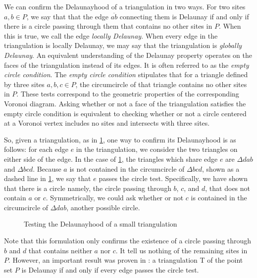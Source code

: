 \documentclass[12pt,twoside]{reedthesis}
\begin{document}
    We can confirm the Delaunayhood of a triangulation in two ways. For two sites $a, b \in P$, we say that that the edge $\overline{ab}$ connecting them is Delaunay if and only if there is a circle passing through them that contains no other sites in $P$. When this is true, we call the edge \emph{locally Delaunay}. When every edge in the triangulation is locally Delaunay, we may say that the triangulation is \emph{globally Delaunay}. An equivalent understanding of the Delaunay property operates on the faces of the triangulation instead of its edges. It is often referred to as the \emph{empty circle condition}. The \emph{empty circle condition} stipulates that for a triangle defined by three sites $a, b, c \in P$, the circumcircle of that triangle contains no other sites in $P$. These tests correspond to the geometric properties of the corresponding Voronoi diagram. Asking whether or not a face of the triangulation satisfies the empty circle condition is equivalent to checking whether or not a circle centered at a Voronoi vertex includes no sites and intersects with three sites.\par

    So, given a triangulation, as in \cref{fig:delaunayhood_small}, one way to confirm its Delaunayhood is as follows: for each edge $e$ in the triangulation, we consider the two triangles on either side of the edge.  In the case of \cref{fig:delaunayhood_small}, the triangles which share edge $e$ are $\Delta dab$ and $\Delta bcd$. Because $a$ is not contained in the circumcircle of $\Delta bcd$, shown as a dashed line in \cref{fig:delaunayhood_small}, we say that $e$ passes the circle test. Specifically, we have shown that there is a circle namely, the circle passing through $b$, $c$, and $d$, that does not contain $a$ or $c$. Symmetrically, we could ask whether or not $c$ is contained in the circumcircle of $\Delta dab$, another possible circle.\par

    \begin{figure}[!htb]
      \centering
      
      \caption{Testing the Delaunayhood of a small triangulation}
      \label{fig:delaunayhood_small}
    \end{figure}

    Note that this formulation only confirms the existence of a circle passing through $b$ and $d$ that contains neither $a$ nor $c$. It tell us nothing of the remaining sites in $P$. However, an important result was proven in \textcite{lee}: a triangulation T of the point set $P$ is Delaunay if and only if every edge passes the circle test.
\end{document}
